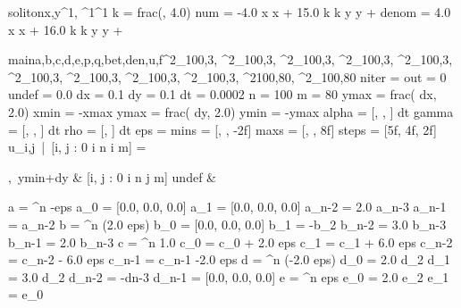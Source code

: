\documentclass[12pt,a4paper]{book}
\begin{document}
\begin{eqcode}{soliton}{x,y}{^1, ^1}{^1}
	k = frac(, 4.0) \lend
	num = -4.0 \cdot x \cdot x + 15.0 \cdot k \cdot k \cdot y \cdot y +  \lend
	denom = 4.0 \cdot x \cdot x + 16.0 \cdot k \cdot k \cdot y \cdot y +
     \lend
	 \lend
\end{eqcode}

\begin{eqcode}{main}{a,b,c,d,e,p,q,bet,den,u,f}{^2_{100,3}, ^2_{100,3}, ^2_{100,3}, ^2_{100,3},  ^2_{100,3},  ^2_{100,3}, ^2_{100,3}, ^2_{100,3}, ^2_{100,3}, ^2{100,80}, ^2_{100,80}}{}
	niter =  \lend
	out = 0 \lend
	undef = 0.0 \lend
	dx = 0.1 \lend
	dy = 0.1 \lend
	dt = 0.0002 \lend
	n = 100 \lend
	m = 80 \lend
	ymax = frac( \cdot dx, 2.0) \lend
	xmin = -xmax \lend
	ymax = frac( \cdot dy, 2.0) \lend
	ymin = -ymax \lend
	alpha = [, , ] \cdot dt \lend
	gamma = [, , ] \cdot dt \lend
	rho = [, ] \cdot dt \lend
	eps =  \lend
	mins = [, , -2f] \lend
	maxs = [, , 8f] \lend
	steps = [5f, 4f, 2f] \lend
	u_{i,j}\  |\  [i, j : 0 \leq i \leq n  \leq i \leq m] =
 	\begin{cases}
		,\  ymin+dy \cdot {} 
			& [i, j : 0 \leq i \leq n  \leq j \leq m] \lend
		undef 
			& \otherwise
	\end{cases}
	\lend
	a = \genar \limits^{n} -eps \lend
	a_0 = [0.0, 0.0, 0.0] \lend
	a_1 = [0.0, 0.0, 0.0] \lend
	a_{n-2} = 2.0 \cdot a_{n-3} \lend
	a_{n-1} = a_{n-2} \lend
	b = \genar \limits^{n} (2.0 \cdot eps) \lend
	b_0 = [0.0, 0.0, 0.0] \lend
	b_1 = -b_2 \lend
	b_{n-2} = 3.0 \cdot b_{n-3} \lend
	b_{n-1} = 2.0 \cdot b_{n-3} \lend
	c = \genar \limits^{n } 1.0 \lend
	c_0 = c_0 + 2.0 \cdot eps \lend
	c_1 = c_1 + 6.0 \cdot eps \lend
	c_{n-2} = c_{n-2} - 6.0 \cdot eps \lend
	c_{n-1} = c_{n-1} -2.0 \cdot eps \lend
	d = \genar \limits^{n} (-2.0 \cdot eps) \lend
	d_0 = 2.0 \cdot d_2 \lend
	d_1 = 3.0 \cdot d_2 \lend
	d_{n-2} = -d{n-3} \lend
	d_{n-1} = [0.0, 0.0, 0.0] \lend
	e = \genar \limits^{n} eps \lend
	e_0 = 2.0 \cdot e_2 \lend
	e_1 = e_0 \lend

\end{eqcode}
\end{document}
